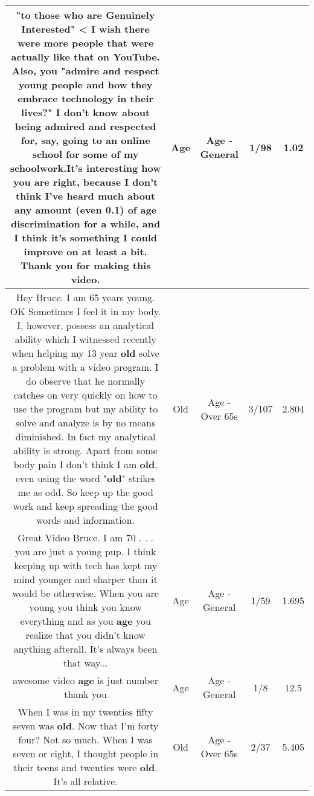 \documentclass[11pt]{article}
\newlength\mylength
\begin{document}
\begin{center}
\begin{longtable}{|C{.65\mylength}|C{.30\mylength}|C{.12\mylength}|C{.12\mylength}|C{.12\mylength}|}
  \small "to those who are Genuinely Interested" < I wish there were more people that were actually like that on YouTube. Also, you "admire and respect young people and how they embrace technology in their lives?" I don't know about being admired and respected for, say, going to an online school for some of my schoolwork.It's interesting how you are right, because I don't think I've heard much about any amount (even 0.1) of \textbf{age} discrimination for a while, and I think it's something I could improve on at least a bit. Thank you for making this video.\normalsize   & Age & Age - General & 1/98 & 1.02 \\  \hline
  \small Hey Bruce. I am 65 years young. OK Sometimes I feel it in my body. I, however,  possess an analytical ability which I witnessed recently when helping my 13 year \textbf{old} solve a problem with a video program. I do observe that he normally catches on very quickly on how to use the program but my ability to solve and analyze is by no means diminished. In fact my analytical ability is strong. Apart from some body pain I don't think I am \textbf{old}, even using the word "\textbf{old}" strikes me as odd. So keep up the good work and keep spreading the good words and information.\normalsize   & Old & Age - Over 65s & 3/107 & 2.804 \\  \hline
  \small Great Video Bruce. I am 70 . . . you are just a young pup. I think keeping up with tech has kept my mind younger and sharper than it would be otherwise. When you are young you think you know everything and as you \textbf{age} you realize that you didn't know anything afterall. It's always been that way...\normalsize   & Age & Age - General & 1/59 & 1.695 \\  \hline
  \small awesome  video   \textbf{age} is  just   number   thank you\normalsize   & Age & Age - General & 1/8 & 12.5 \\  \hline
  \small When I was in my twenties fifty seven was \textbf{old}. Now that I'm forty four? Not so much. When I was seven or eight, I thought people in their teens and twenties were \textbf{old}. It's all relative.\normalsize   & Old & Age - Over 65s & 2/37 & 5.405 \\  \hline

\end{longtable}
\end{center}
\end{document}
